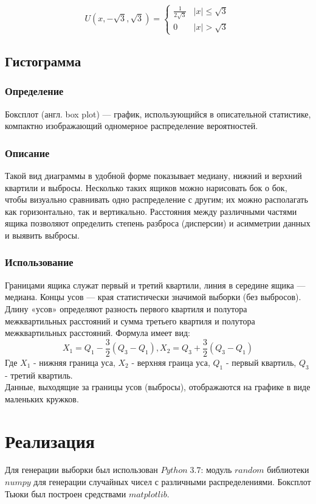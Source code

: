 \documentclass[a4]{article}
\begin{document}
			\begin{equation}\label{eqn:uniform}
			U(x,-\sqrt{3}, \sqrt{3}) = 
			\begin{cases}
			\frac{1}{2\sqrt{3}} &\vert x\vert \leqslant \sqrt{3}\\
			0 &\vert x\vert > \sqrt{3}
			\end{cases}
			\end{equation}
		
		\subsection{Гистограмма}
			\subsubsection{Определение}
				Боксплот (англ. box plot) — график, использующийся в описательной статистике, компактно изображающий одномерное распределение вероятностей.
		
			\subsubsection{Описание}
				Такой вид диаграммы в удобной форме показывает медиану, нижний и верхний квартили и выбросы. Несколько таких ящиков можно нарисовать бок
				о бок, чтобы визуально сравнивать одно распределение с другим; их можно располагать как горизонтально, так и вертикально. Расстояния между
				различными частями ящика позволяют определить степень разброса (дисперсии) и асимметрии данных и выявить выбросы.
			\subsubsection{Использование}
				Границами ящика служат первый и третий квартили, линия в середине
				ящика — медиана. Концы усов — края статистически значимой выборки
				(без выбросов). Длину «усов» определяют разность первого квартиля и полутора межквартильных расстояний и сумма третьего квартиля и полутора
				межквартильных расстояний. Формула имеет вид:\\
				$$X_1 = Q_1 - \frac{3}{2}(Q_3 - Q_1), X_2 = Q_3 + \frac{3}{2}(Q_3 - Q_1)$$
				Где $X_1$ - нижняя граница уса, $X_2$ - верхняя граица уса, $Q_1$ - первый квартиль, $Q_3$ - третий квартиль.\\
				Данные, выходящие за границы усов (выбросы), отображаются на графике
				в виде маленьких кружков.
	\section{Реализация}
	Для генерации выборки был использован $Python\;3.7$: модуль $random$ библиотеки $numpy$ для генерации случайных чисел с различными распределениями. Боксплот Тьюки был построен средствами $matplotlib$.
	\newpage
\end{document}
